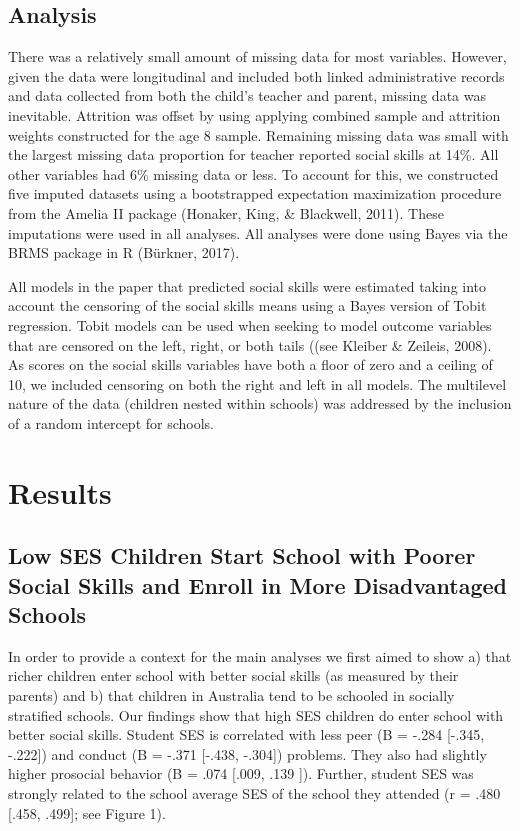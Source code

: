 \documentclass[
  english,
  man]{apa6}
\begin{document}
\hypertarget{analysis}{%
\subsection{Analysis}\label{analysis}}

There was a relatively small amount of missing data for most variables. However, given the data were longitudinal and included both linked administrative records and data collected from both the child's teacher and parent, missing data was inevitable. Attrition was offset by using applying combined sample and attrition weights constructed for the age 8 sample. Remaining missing data was small with the largest missing data proportion for teacher reported social skills at 14\%. All other variables had 6\% missing data or less. To account for this, we constructed five imputed datasets using a bootstrapped expectation maximization procedure from the Amelia II package (Honaker, King, \& Blackwell, 2011). These imputations were used in all analyses. All analyses were done using Bayes via the BRMS package in R (Bürkner, 2017).

All models in the paper that predicted social skills were estimated taking into account the censoring of the social skills means using a Bayes version of Tobit regression. Tobit models can be used when seeking to model outcome variables that are censored on the left, right, or both tails ((see Kleiber \& Zeileis, 2008). As scores on the social skills variables have both a floor of zero and a ceiling of 10, we included censoring on both the right and left in all models. The multilevel nature of the data (children nested within schools) was addressed by the inclusion of a random intercept for schools.

\hypertarget{results}{%
\section{Results}\label{results}}

\hypertarget{low-ses-children-start-school-with-poorer-social-skills-and-enroll-in-more-disadvantaged-schools}{%
\subsection{Low SES Children Start School with Poorer Social Skills and Enroll in More Disadvantaged Schools}\label{low-ses-children-start-school-with-poorer-social-skills-and-enroll-in-more-disadvantaged-schools}}

In order to provide a context for the main analyses we first aimed to show a) that richer children enter school with better social skills (as measured by their parents) and b) that children in Australia tend to be schooled in socially stratified schools. Our findings show that high SES children do enter school with better social skills. Student SES is correlated with less peer (B = -.284 {[}-.345, -.222{]}) and conduct (B = -.371 {[}-.438, -.304{]}) problems. They also had slightly higher prosocial behavior (B = .074 {[}.009, .139 {]}). Further, student SES was strongly related to the school average SES of the school they attended (r = .480 {[}.458, .499{]}; see Figure 1).
\end{document}
